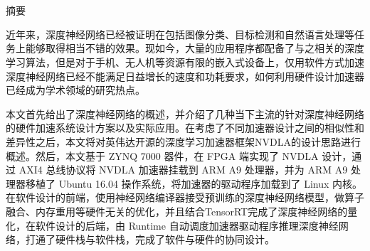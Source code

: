 \maketitle%
\chapter[摘要]{\MyTitleCh}
\setcounter{page}{1}%

\begin{center}
\vspace{-0.3cm}
 \songti 摘要
\vspace{0.3cm}
\end{center}

近年来，深度神经网络已经被证明在包括图像分类、目标检测和自然语言处理等任务上能够取得相当不错的效果。现如今，大量的应用程序都配备了与之相关的深度学习算法，但是对于手机、无人机等资源有限的嵌入式设备上，仅用软件方式加速深度神经网络已经不能满足日益增长的速度和功耗要求，如何利用硬件设计加速器已经成为学术领域的研究热点。

本文首先给出了深度神经网络的概述，并介绍了几种当下主流的针对深度神经网络的硬件加速系统设计方案以及实际应用。在考虑了不同加速器设计之间的相似性和差异性之后，本文将对英伟达开源的深度学习加速器框架NVDLA的设计思路进行概述。然后，本文基于 ZYNQ 7000 器件，在 FPGA 端实现了 NVDLA 设计，通过 AXI4 总线协议将 NVDLA 加速器挂载到 ARM A9 处理器，并为 ARM A9 处理器移植了 Ubuntu 16.04 操作系统，将加速器的驱动程序加载到了 Linux 内核。在软件设计的前端，使用神经网络编译器接受预训练的深度神经网络模型，做算子融合、内存重用等硬件无关的优化，并且结合TensorRT完成了深度神经网络的量化，在软件设计的后端，由 Runtime 自动调度加速器驱动程序推理深度神经网络，打通了硬件栈与软件栈，完成了软件与硬件的协同设计。

{
}
